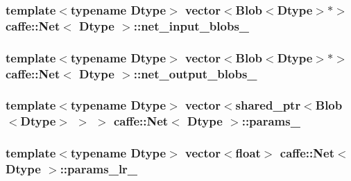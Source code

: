 \hypertarget{classcaffe_1_1_net_aeed682088cd2252f8402cb7b169d4f39}{
\subsubsection[{net\+\_\+input\+\_\+blobs\+\_\+}]{\setlength{\rightskip}{0pt plus 5cm}template$<$typename Dtype$>$ vector$<${\bf Blob}$<$Dtype$>$$\ast$$>$ {\bf caffe\+::\+Net}$<$ Dtype $>$\+::net\+\_\+input\+\_\+blobs\+\_\+\hspace{0.3cm}{\ttfamily [protected]}}}\label{classcaffe_1_1_net_aeed682088cd2252f8402cb7b169d4f39}
\hypertarget{classcaffe_1_1_net_abbcd68a31a7ddc67dcac789fe880da23}{
\subsubsection[{net\+\_\+output\+\_\+blobs\+\_\+}]{\setlength{\rightskip}{0pt plus 5cm}template$<$typename Dtype$>$ vector$<${\bf Blob}$<$Dtype$>$$\ast$$>$ {\bf caffe\+::\+Net}$<$ Dtype $>$\+::net\+\_\+output\+\_\+blobs\+\_\+\hspace{0.3cm}{\ttfamily [protected]}}}\label{classcaffe_1_1_net_abbcd68a31a7ddc67dcac789fe880da23}
\hypertarget{classcaffe_1_1_net_accf52332675952dd27dfc8d3c27fa583}{
\subsubsection[{params\+\_\+}]{\setlength{\rightskip}{0pt plus 5cm}template$<$typename Dtype$>$ vector$<$shared\+\_\+ptr$<${\bf Blob}$<$Dtype$>$ $>$ $>$ {\bf caffe\+::\+Net}$<$ Dtype $>$\+::params\+\_\+\hspace{0.3cm}{\ttfamily [protected]}}}\label{classcaffe_1_1_net_accf52332675952dd27dfc8d3c27fa583}
\hypertarget{classcaffe_1_1_net_aeb1f85c97372f57336e4e1af3eb7b9db}{
\subsubsection[{params\+\_\+lr\+\_\+}]{\setlength{\rightskip}{0pt plus 5cm}template$<$typename Dtype$>$ vector$<$float$>$ {\bf caffe\+::\+Net}$<$ Dtype $>$\+::params\+\_\+lr\+\_\+\hspace{0.3cm}{\ttfamily [protected]}}}\label{classcaffe_1_1_net_aeb1f85c97372f57336e4e1af3eb7b9db}
